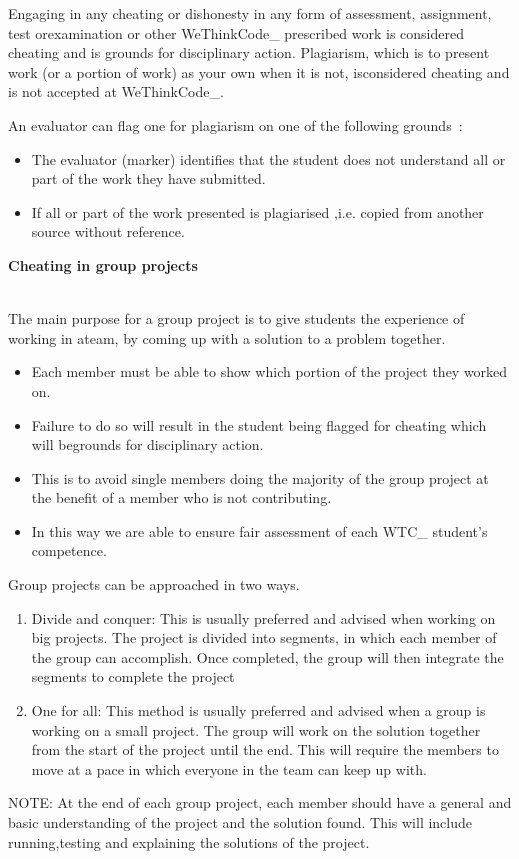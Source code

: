Engaging in any cheating or dishonesty in any form of assessment, 
assignment, test orexamination or other WeThinkCode\_ prescribed work 
is considered cheating and is grounds for disciplinary action.
Plagiarism, which is to present work (or a portion of work) as your 
own when it is not, isconsidered cheating and is not accepted at 
WeThinkCode\_.

An evaluator can flag one for plagiarism on one of the following grounds\
:\begin{itemize}
     
\item The evaluator (marker) identifies that the student does not understand
all or part of the work they have submitted.
\item If all or part of the work presented is plagiarised ,i.e. copied from 
another source without reference.
\end{itemize}

\begin{large}\textbf{Cheating in group projects}\end{large}\\

The main purpose for a group project is to give students the experience of working in ateam, by coming up with a solution to a problem together.
\begin{itemize}
    \item Each member must be able to show which portion of the project they worked on. 
    \item Failure to do so will result in the student being flagged for cheating which will begrounds for disciplinary action.
    \item This is to avoid single members doing the majority of the group project at the benefit of a member who is not contributing.
    \item In this way we are able to ensure fair assessment of each WTC\_ student’s competence.
\end{itemize}    
Group projects can be approached in two ways.
\begin{enumerate}
    \item Divide and conquer: This is usually preferred and advised when working on big projects. The project is divided into segments, in which each member of the group can accomplish. Once completed, the group will then integrate the segments to complete the project
    \item One for all: This method is usually preferred and advised when a group is working on a small project. The group will work on the solution together from the start of the project until the end. This will require the members to move at a pace in which everyone in the team can keep up with.
\end{enumerate}    
NOTE: At the end of each group project, each member should have a general and basic understanding of the project and the solution found. This will include running,testing and explaining the solutions of the project.

